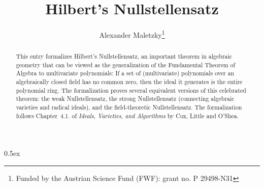 \documentclass[11pt,a4paper]{article}
\begin{document}
\title{Hilbert's Nullstellensatz}
\author{Alexander Maletzky\thanks{Funded by the Austrian 
Science Fund (FWF): grant no. P 29498-N31}}
\maketitle

\begin{abstract}
This entry formalizes Hilbert's Nullstellensatz, an important theorem in algebraic geometry that can be viewed as the generalization of the Fundamental Theorem of Algebra to multivariate polynomials: If a set of (multivariate) polynomials over an algebraically closed field has no common zero, then the ideal it generates is the entire polynomial ring. The formalization proves several equivalent versions of this celebrated theorem: the weak Nullstellensatz, the strong Nullstellensatz (connecting algebraic varieties and radical ideals), and the field-theoretic Nullstellensatz. The formalization follows Chapter~4.1. of \emph{Ideals, Varieties, and Algorithms} by Cox, Little and O'Shea.
\end{abstract}

\tableofcontents

\parindent 0pt\parskip 0.5ex

\newpage



\nocite{CLO}


\end{document}
